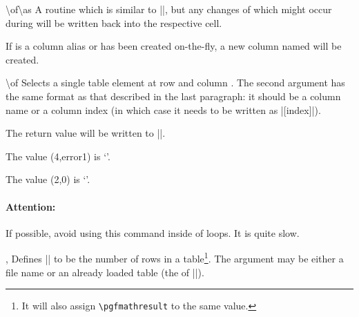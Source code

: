 \begin{command}{\pgfplotstablemodifyeachcolumnelement{}\textbackslash of\textbackslash as}
	A routine which is similar to |\pgfplotstableforeachcolumnelement|,
	but any changes of  which might occur during  will be written back into the respective cell.

\begin{codeexample}[]
\loadedtable
{}\of\loadedtable\as\cell{%
	\edef\cell{\#\pgfplotstablerow: \cell}%
}
\pgfplotstabletypeset[columns=error1,string type]{\loadedtable}
\end{codeexample}

	If  is a column alias or has been created on-the-fly, a new column named  will be created.
\end{command}

\begin{command}{\pgfplotstablegetelem{}\textbackslash of}
	Selects a single table element at row  and column . The second argument has the same format as that described in the last paragraph: it should be a column name or a column index (in which case it needs to be written as |[index]|).

	The return value will be written to |\pgfplotsretval|.
\begin{codeexample}[]
\of{\loadedtable}
The value (4,error1) is `\pgfplotsretval'. 

\of{\loadedtable}
The value (2,0) is `\pgfplotsretval'.
\end{codeexample}

	\paragraph{Attention:} If possible, avoid using this command inside of loops. It is quite slow.
\end{command}

\begin{commandlist}{%
	\pgfplotstablegetrowsof{},
	\pgfplotstablegetcolsof{}}
	Defines |\pgfplotsretval| to be the number of rows in a table\footnote{It will also assign \texttt{\textbackslash pgfmathresult} to the same value.}. The argument may be either a file name or an already loaded table (the  of |\pgfplotstableread|).
\end{commandlist}


